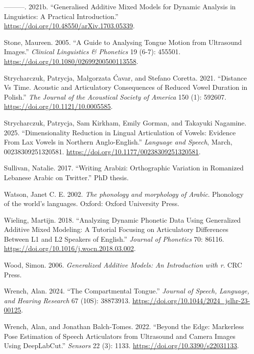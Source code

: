\documentclass[
]{interact}
\newlength{\cslhangindent}
\newenvironment{CSLReferences}[2] %
 {\begin{list}{}{%
  \setlength{\itemindent}{0pt}
  \setlength{\leftmargin}{0pt}
  \setlength{\parsep}{0pt}
  \ifodd #1
   \setlength{\leftmargin}{\cslhangindent}
   \setlength{\itemindent}{-1\cslhangindent}
  \fi
  \setlength{\itemsep}{#2\baselineskip}}}
 {\end{list}}
\begin{document}
\begin{CSLReferences}{1}{0}
---------. 2021b. {``Generalised Additive Mixed Models for Dynamic
Analysis in Linguistics: A Practical Introduction.''}
\url{https://doi.org/10.48550/arXiv.1703.05339}.

Stone, Maureen. 2005. {``A Guide to Analysing Tongue Motion from
Ultrasound Images.''} \emph{Clinical Linguistics \& Phonetics} 19 (6-7):
455501. \url{https://doi.org/10.1080/02699200500113558}.

Strycharczuk, Patrycja, Małgorzata Ćavar, and Stefano Coretta. 2021.
{``Distance Vs Time. Acoustic and Articulatory Consequences of Reduced
Vowel Duration in Polish.''} \emph{The Journal of the Acoustical Society
of America} 150 (1): 592607. \url{https://doi.org/10.1121/10.0005585}.

Strycharczuk, Patrycja, Sam Kirkham, Emily Gorman, and Takayuki
Nagamine. 2025. {``Dimensionality Reduction in Lingual Articulation of
Vowels: Evidence From Lax Vowels in Northern Anglo-English.''}
\emph{Language and Speech}, March, 00238309251320581.
\url{https://doi.org/10.1177/00238309251320581}.

Sullivan, Natalie. 2017. {``Writing Arabizi: Orthographic Variation in
Romanized Lebanese Arabic on Twitter.''} PhD thesis.

Watson, Janet C. E. 2002. \emph{The phonology and morphology of Arabic}.
Phonology of the world's languages. Oxford: Oxford University Press.

Wieling, Martijn. 2018. {``Analyzing Dynamic Phonetic Data Using
Generalized Additive Mixed Modeling: A Tutorial Focusing on Articulatory
Differences Between L1 and L2 Speakers of English.''} \emph{Journal of
Phonetics} 70: 86116. \url{https://doi.org/10.1016/j.wocn.2018.03.002}.

Wood, Simon. 2006. \emph{Generalized Additive Models: An Introduction
with r}. CRC Press.

Wrench, Alan. 2024. {``The Compartmental Tongue.''} \emph{Journal of
Speech, Language, and Hearing Research} 67 (10S): 38873913.
\url{https://doi.org/10.1044/2024_jslhr-23-00125}.

Wrench, Alan, and Jonathan Balch-Tomes. 2022. {``Beyond the Edge:
Markerless Pose Estimation of Speech Articulators from Ultrasound and
Camera Images Using DeepLabCut.''} \emph{Sensors} 22 (3): 1133.
\url{https://doi.org/10.3390/s22031133}.


\end{CSLReferences}
\end{document}
